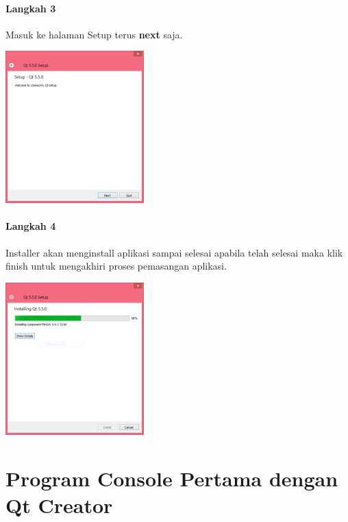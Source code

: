   
\paragraph{Langkah 3}
  Masuk ke halaman Setup terus \textbf{next} saja.

  
\begin{center}
	 \includegraphics[width=0.4\textwidth]{../manuscript/images/install-qt-3.PNG}
\end{center}
 


  
\paragraph{Langkah 4}
  Installer akan menginstall aplikasi sampai selesai apabila telah
  selesai maka klik finish untuk mengakhiri proses pemasangan aplikasi.


  


\begin{center}

	\includegraphics[width=0.4\textwidth]{../manuscript/images/install-qt-4.PNG}
\end{center}

\section{Program Console Pertama dengan Qt
Creator}\label{program-console-pertama-dengan-qt-creator}



